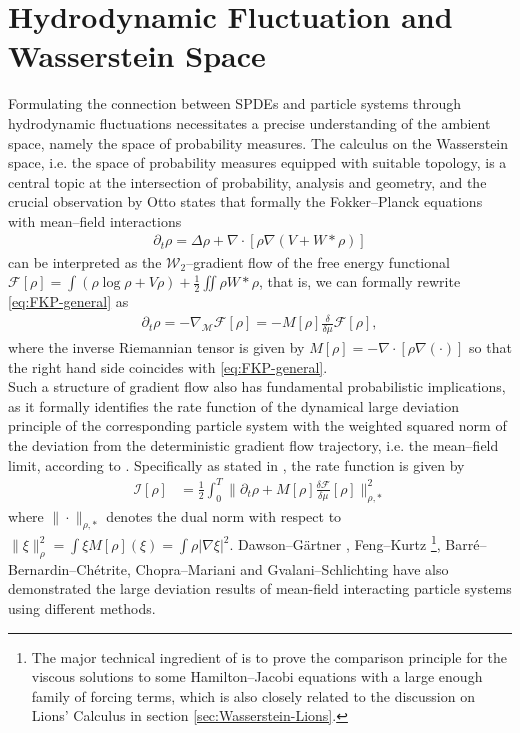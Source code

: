 \section{Hydrodynamic Fluctuation and Wasserstein Space}\label{sec:Wasserstein-LDP}

Formulating the connection between SPDEs and particle systems through hydrodynamic fluctuations necessitates a precise understanding of the ambient space, namely the space of probability measures. The calculus on the Wasserstein space, i.e. the space of probability measures equipped with suitable topology, is a central topic at the intersection of probability, analysis and geometry, and the crucial observation by Otto \cite{Otto2001,Jordan1998} states that formally the Fokker--Planck equations with mean--field interactions 
\begin{align}\label{eq:FKP-general}
\partial_t \rho = \Delta \rho + \nabla \cdot \left[\rho \nabla (V + W * \rho) \right]
\end{align}
can be interpreted as the $\mathcal{W}_2$--gradient flow of the free energy functional $\mathcal{F}[\rho] = \int (\rho \log \rho + V \rho) + \frac{1}{2} \iint \rho W\ast \rho$, that is, we can formally rewrite \eqref{eq:FKP-general} as 
\begin{align*}
\partial_t \rho = -\nabla_{\mathcal{M}}\mathcal{F}[\rho] = - M[\rho] \frac{\delta}{\delta \mu}\mathcal{F}[\rho],
\end{align*}
where the inverse Riemannian tensor is given by $M[\rho] = - \nabla \cdot [\rho \nabla (\cdot)]$ so that the right hand side coincides with \eqref{eq:FKP-general}.\\

Such a structure of gradient flow also has fundamental probabilistic implications, as it formally identifies the rate function of the dynamical large deviation principle of the corresponding particle system with the weighted squared norm of the deviation from the deterministic gradient flow trajectory, i.e. the mean--field limit, according to \cite{adams2013large}. Specifically as stated in \cite[(19)]{adams2013large}, the rate function is given by
\begin{align*}
\mathcal{I}[\rho] &= \frac{1}{2}\int^T_0 \Big\|\partial_t \rho + M[\rho]\frac{\delta \mathcal{F}}{\delta \mu}[\rho] \Big\|^2_{\rho,\ast}
\end{align*}
where $\|\cdot\|_{\rho,\ast}$ denotes the dual norm with respect to 
$\|\xi\|_{\rho}^2 = \int \xi M[\rho](\xi) = \int \rho |\nabla \xi|^2$. Dawson--G\"artner \cite{DJ87,DJ89}, Feng--Kurtz \cite{FengKurtz2006}\footnote{The major technical ingredient of  \cite{FengKurtz2006}  is to prove the comparison principle for the viscous solutions to some Hamilton--Jacobi equations with a large enough family of forcing terms, which is also closely related to the discussion on Lions' Calculus in section \ref{sec:Wasserstein-Lions}.}, Barr\'e--Bernardin--Ch\'etrite, Chopra--Mariani \cite{BBCCM19} and Gvalani--Schlichting \cite{GS20} have also demonstrated the large deviation results of mean-field interacting particle systems using different methods. 


